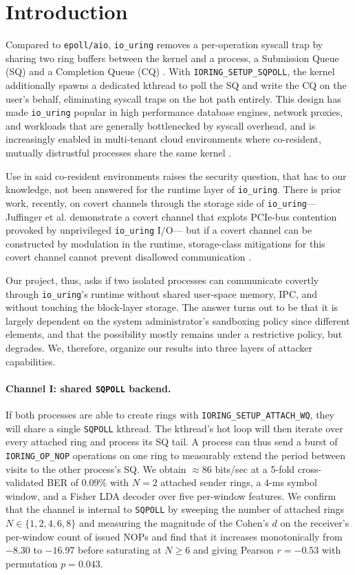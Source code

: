 \documentclass[letterpaper,twocolumn,10pt]{article}
\newcommand{\code}[1]{\texttt{#1}}
\newcommand{\iouring}{\texttt{io\_uring}\xspace}
\begin{document}
\section{Introduction}
Compared to \texttt{epoll/aio}, \iouring removes a per-operation syscall trap by sharing two ring buffers between the kernel and a process, a Submission Queue (SQ) and a Completion Queue (CQ) \cite{axboe2019efficient}. With \texttt{IORING\_SETUP\_SQPOLL}, the kernel additionally spawns a dedicated kthread to poll the SQ and write the CQ on the user's behalf, eliminating syscall traps on the hot path entirely. This design has made \iouring popular in high performance database engines, network proxies, and workloads that are generally bottlenecked by syscall overhead, and is increasingly enabled in multi-tenant cloud environments where co-resident, mutually distrustful processes share the same kernel \cite{jasny2025iouring, kalmbach2020io_uring}.

Use in said co-resident environments raises the security question, that has to our knowledge, not been answered for the runtime layer of \iouring. There is prior work, recently, on covert channels through the storage side of \iouring--- Juffinger et al. demonstrate a covert channel that explots PCIe-bus contention provoked by unprivileged \iouring I/O--- but if a covert channel can be constructed by modulation in the runtime, storage-class mitigations for this covert channel cannot prevent disallowed communication \cite{juffinger2025secret}.

Our project, thus, asks if two isolated processes can communicate covertly through \iouring's runtime without shared user-space memory, IPC, and without touching the block-layer storage. The answer turns out to be that it is largely dependent on the system administrator's sandboxing policy since different elements, and that the possibility mostly remains under a restrictive policy, but degrades. We, therefore, organize our results into three layers of attacker capabilities.

\paragraph{Channel I: shared \code{SQPOLL} backend.} If both processes are able to create rings with \code{IORING\_SETUP\_ATTACH\_WQ}, they will share a single \code{SQPOLL} kthread. The kthread's hot loop will then iterate over every attached ring and process its SQ tail. A process can thus send a burst of \code{IORING\_OP\_NOP} operations on one ring to measurably extend the period between visits to the other process's SQ. We obtain $\approx 86$ bits/sec at a 5-fold cross-validated BER of $0.09\%$ with $N=2$ attached sender rings, a $4$-ms symbol window, and a Fisher LDA decoder over five per-window features. We confirm that the channel is internal to \code{SQPOLL} by sweeping the number of attached rings $N \in \{1,2,4,6,8 \}$ and measuring the magnitude of the Cohen's $d$ on the receiver's per-window count of issued NOPs and find that it increases monotonically from $-8.30$ to $-16.97$ before saturating at $N \geq 6$ and giving Pearson $r = -0.53$ with permutation $p = 0.043$.
\end{document}
